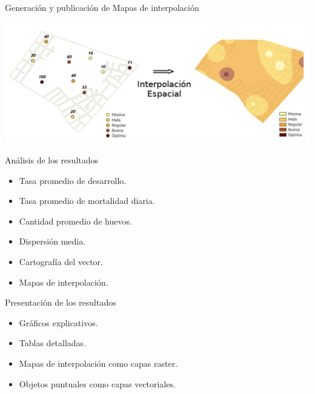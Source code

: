 

\begin{frame}[c]{Generación y publicación de Mapas de interpolación}
\begin{center}
    \includegraphics[width=\textwidth]{./graphics/identificacion-focos.png}
\end{center}
\end{frame}


\begin{frame}[t]{Análisis de los resultados}
\begin{center}
    \begin{itemize}
      \item Tasa promedio de desarrollo.
      \item Tasa promedio de mortalidad diaria.
      \item Cantidad promedio de huevos.
      \item Dispersión media.
      \item Cartografía del vector.
      \item Mapas de interpolación.
    \end{itemize}
\end{center}
\end{frame}


\begin{frame}[t]{Presentación de los resultados}
  \begin{itemize}
    \item Gráficos explicativos.
    \item Tablas detalladas.
    \item Mapas de interpolación como capas raster.
    \item Objetos puntuales como capas vectoriales.
  \end{itemize}
\end{frame}
